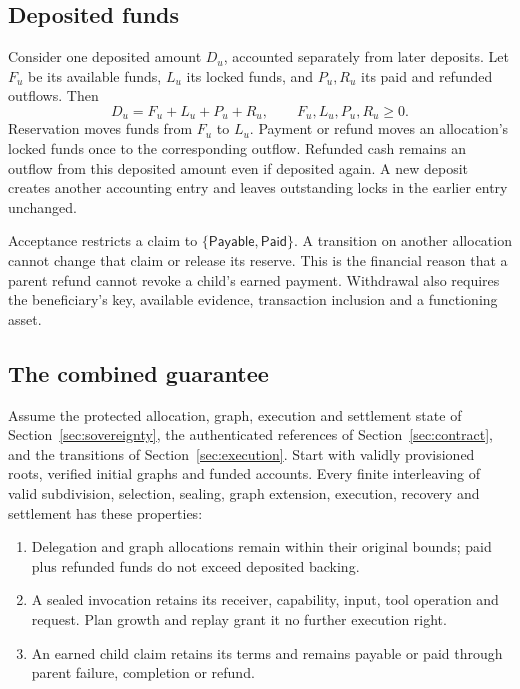 \subsection{Deposited funds}
Consider one deposited amount $D_u$, accounted separately from later deposits.
Let $F_u$ be its available funds, $L_u$ its locked funds, and $P_u,R_u$ its paid
and refunded outflows. Then
\begin{equation}
 D_u=F_u+L_u+P_u+R_u,\qquad F_u,L_u,P_u,R_u\geq0.
 \label{eq:conservation}
\end{equation}
Reservation moves funds from $F_u$ to $L_u$. Payment or refund moves an
allocation's locked funds once to the corresponding outflow. Refunded cash
remains an outflow from this deposited amount even if deposited again. A new
deposit creates another accounting entry and leaves outstanding locks in the
earlier entry unchanged.

Acceptance restricts a claim to $\{\textsf{Payable},\textsf{Paid}\}$. A transition
on another allocation cannot change that claim or release its reserve.
This is the financial reason that a parent refund cannot revoke a child's
earned payment. Withdrawal also requires the beneficiary's key, available
evidence, transaction inclusion and a functioning asset.

\subsection{The combined guarantee}
\begin{proposition}
Assume the protected allocation, graph, execution and settlement state of
Section~\ref{sec:sovereignty}, the authenticated references of
Section~\ref{sec:contract}, and the transitions of Section~\ref{sec:execution}.
Start with validly provisioned roots, verified initial graphs and funded
accounts. Every finite interleaving of valid subdivision, selection, sealing, graph
extension, execution, recovery and settlement has these properties:
\begin{enumerate}
 \item Delegation and graph allocations remain within their original bounds;
       paid plus refunded funds do not exceed deposited backing.
 \item A sealed invocation retains its receiver, capability, input, tool operation
       and request. Plan growth and replay grant it no further execution right.
 \item An earned child claim retains its terms and remains payable or paid
       through parent failure, completion or refund.
\end{enumerate}
\end{proposition}

